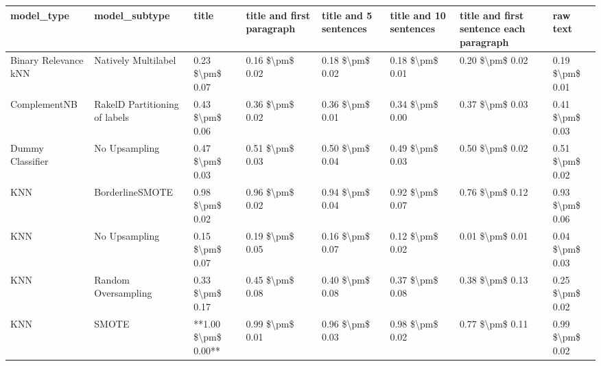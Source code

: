 \begin{tabular}{llllllll}
\toprule
                     model\_type &                 model\_subtype &               title & title and first paragraph & title and 5 sentences & title and 10 sentences & title and first sentence each paragraph &        raw text \\
\midrule
           Binary Relevance kNN &           Natively Multilabel &     0.23 \$\textbackslash pm\$ 0.07 &           0.16 \$\textbackslash pm\$ 0.02 &       0.18 \$\textbackslash pm\$ 0.02 &        0.18 \$\textbackslash pm\$ 0.01 &                         0.20 \$\textbackslash pm\$ 0.02 & 0.19 \$\textbackslash pm\$ 0.01 \\
                   ComplementNB & RakelD Partitioning of labels &     0.43 \$\textbackslash pm\$ 0.06 &           0.36 \$\textbackslash pm\$ 0.02 &       0.36 \$\textbackslash pm\$ 0.01 &        0.34 \$\textbackslash pm\$ 0.00 &                         0.37 \$\textbackslash pm\$ 0.03 & 0.41 \$\textbackslash pm\$ 0.03 \\
               Dummy Classifier &                 No Upsampling &     0.47 \$\textbackslash pm\$ 0.03 &           0.51 \$\textbackslash pm\$ 0.03 &       0.50 \$\textbackslash pm\$ 0.04 &        0.49 \$\textbackslash pm\$ 0.03 &                         0.50 \$\textbackslash pm\$ 0.02 & 0.51 \$\textbackslash pm\$ 0.02 \\
                            KNN &               BorderlineSMOTE &     0.98 \$\textbackslash pm\$ 0.02 &           0.96 \$\textbackslash pm\$ 0.02 &       0.94 \$\textbackslash pm\$ 0.04 &        0.92 \$\textbackslash pm\$ 0.07 &                         0.76 \$\textbackslash pm\$ 0.12 & 0.93 \$\textbackslash pm\$ 0.06 \\
                            KNN &                 No Upsampling &     0.15 \$\textbackslash pm\$ 0.07 &           0.19 \$\textbackslash pm\$ 0.05 &       0.16 \$\textbackslash pm\$ 0.07 &        0.12 \$\textbackslash pm\$ 0.02 &                         0.01 \$\textbackslash pm\$ 0.01 & 0.04 \$\textbackslash pm\$ 0.03 \\
                            KNN &           Random Oversampling &     0.33 \$\textbackslash pm\$ 0.17 &           0.45 \$\textbackslash pm\$ 0.08 &       0.40 \$\textbackslash pm\$ 0.08 &        0.37 \$\textbackslash pm\$ 0.08 &                         0.38 \$\textbackslash pm\$ 0.13 & 0.25 \$\textbackslash pm\$ 0.02 \\
                            KNN &                         SMOTE & **1.00 \$\textbackslash pm\$ 0.00** &           0.99 \$\textbackslash pm\$ 0.01 &       0.96 \$\textbackslash pm\$ 0.03 &        0.98 \$\textbackslash pm\$ 0.02 &                         0.77 \$\textbackslash pm\$ 0.11 & 0.99 \$\textbackslash pm\$ 0.02 \\

\end{tabular}
